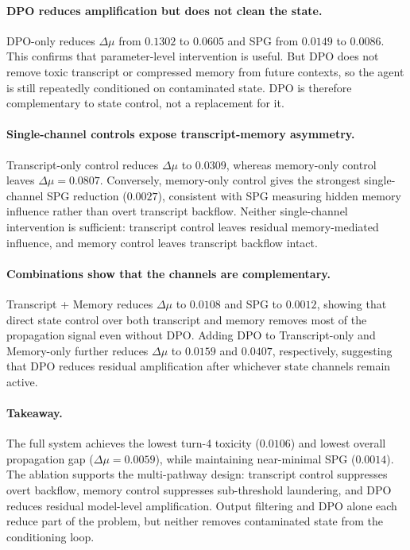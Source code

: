 \paragraph{DPO reduces amplification but does not clean the state.}
DPO-only reduces $\Delta\mu$ from $0.1302$ to $0.0605$ and SPG from $0.0149$ to $0.0086$. This confirms that parameter-level intervention is useful. But DPO does not remove toxic transcript or compressed memory from future contexts, so the agent is still repeatedly conditioned on contaminated state. DPO is therefore complementary to state control, not a replacement for it.

\paragraph{Single-channel controls expose transcript-memory asymmetry.}
Transcript-only control reduces $\Delta\mu$ to $0.0309$, whereas memory-only control leaves $\Delta\mu=0.0807$. Conversely, memory-only control gives the strongest single-channel SPG reduction ($0.0027$), consistent with SPG measuring hidden memory influence rather than overt transcript backflow. Neither single-channel intervention is sufficient: transcript control leaves residual memory-mediated influence, and memory control leaves transcript backflow intact.

\paragraph{Combinations show that the channels are complementary.}
Transcript + Memory reduces $\Delta\mu$ to $0.0108$ and SPG to $0.0012$, showing that direct state control over both transcript and memory removes most of the propagation signal even without DPO. Adding DPO to Transcript-only and Memory-only further reduces $\Delta\mu$ to $0.0159$ and $0.0407$, respectively, suggesting that DPO reduces residual amplification after whichever state channels remain active.

\paragraph{Takeaway.}
The full system achieves the lowest turn-4 toxicity ($0.0106$) and lowest overall propagation gap ($\Delta\mu=0.0059$), while maintaining near-minimal SPG ($0.0014$). The ablation supports the multi-pathway design: transcript control suppresses overt backflow, memory control suppresses sub-threshold laundering, and DPO reduces residual model-level amplification. Output filtering and DPO alone each reduce part of the problem, but neither removes contaminated state from the conditioning loop.

